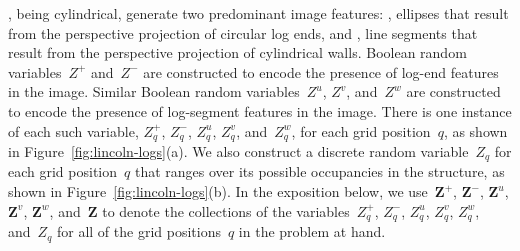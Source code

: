 \LincolnLogs, being cylindrical, generate two predominant image features:
, ellipses that result from the perspective projection of
circular log ends, and , line segments that result from
the perspective projection of cylindrical walls.
%
Boolean random variables~$Z^+$ and~$Z^-$ are constructed to encode the
presence of log-end features in the image.
%
Similar Boolean random variables~$Z^u$, $Z^v$, and~$Z^w$ are constructed
to encode the presence of log-segment features in the image.
%
There is one instance of each such variable, $Z^+_q$, $Z^-_q$, $Z^u_q$,
$Z^v_q$, and~$Z^w_q$, for each grid position~$q$, as shown in
Figure~\ref{fig:lincoln-logs}(a).
%
We also construct a discrete random variable~$Z_q$ for each grid position~$q$
that ranges over its possible occupancies in the structure, as shown in
Figure~\ref{fig:lincoln-logs}(b).
%
In the exposition below, we use~$\mathbf{Z}^+$, $\mathbf{Z}^-$, $\mathbf{Z}^u$,
$\mathbf{Z}^v$, $\mathbf{Z}^w$, and~$\mathbf{Z}$ to denote the collections of
the variables~$Z^+_q$, $Z^-_q$, $Z^u_q$, $Z^v_q$, $Z^w_q$, and~$Z_q$ for all
of the grid positions~$q$ in the problem at hand.

